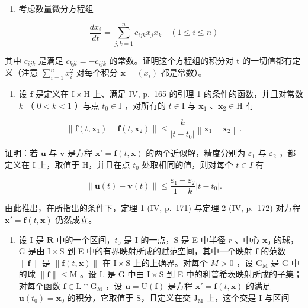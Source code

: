 \begin{enumerate}
\def\labelenumi{\arabic{enumi})}
\setcounter{enumi}{6}
\tightlist
\item
  考虑数量微分方程组
\end{enumerate}

\[
\frac {d x _ {i}}{d t} = \sum_ {j, k = 1} ^ {n} c _ {i j k} x _ {j} x _ {k} \quad (1 \leqslant i \leqslant n)
\]

其中 \(c_{ijk}\) 是满足 \(c_{kji} = -c_{ijk}\) 的常数。证明这个方程组的积分对 t 的一切值都有定义（注意 \(\sum_{i=1}^{n} x_{i}^{2}\) 对每个积分 \(\mathbf{x} = (x_{i})\) 都是常数）。

\begin{enumerate}
\def\labelenumi{\arabic{enumi})}
\setcounter{enumi}{7}
\tightlist
\item
  设 \(\mathbf{f}\) 是定义在 \(\mathrm{I} \times \mathrm{H}\) 上、满足 IV, p.~165 的引理 1 的条件的函数，并且对常数 \(k\) （ \(0 < k < 1\) ）与点 \(t_0 \in \mathrm{I}\) ，对所有的 \(t \in \mathrm{I}\) 与 \(\mathbf{x}_1\) 、\(\mathbf{x}_2 \in \mathrm{H}\) 有
\end{enumerate}

\[
\left\| \mathbf {f} (t, \mathbf {x} _ {1}) - \mathbf {f} (t, \mathbf {x} _ {2}) \right\| \leqslant \frac {k}{\left| t - t _ {0} \right|} \left\| \mathbf {x} _ {1} - \mathbf {x} _ {2} \right\|.
\]

证明：若 \(\mathbf{u}\) 与 \(\mathbf{v}\) 是方程 \(\mathbf{x}' = \mathbf{f}(t, \mathbf{x})\) 的两个近似解，精度分别为 \(\varepsilon_1\) 与 \(\varepsilon_2\) ，都定义在 I 上，取值于 H，并且在点 \(t_0\) 处取相同的值，则对每个 \(t \in I\) 有

\[
\left\| \mathbf {u} (t) - \mathbf {v} (t) \right\| \leqslant \frac {\varepsilon_ {1} - \varepsilon_ {2}}{1 - k} | t - t _ {0} |.
\]

由此推出，在所指出的条件下，定理 1 (IV, p.~171) 与定理 2 (IV, p.~172) 对方程 \(\mathbf{x}' = \mathbf{f}(t, \mathbf{x})\) 仍然成立。

\begin{enumerate}
\def\labelenumi{* \arabic{enumi})}
\setcounter{enumi}{8}
\tightlist
\item
  设 I 是 \(\mathbf{R}\) 中的一个区间，\(t_0\) 是 I 的一点，S 是 E 中半径 \(r\) 、中心 \(\mathbf{x}_0\) 的球，G 是由 \(\mathrm{I} \times \mathrm{S}\) 到 E 中的有界映射所成的赋范空间，其中一个映射 \(\mathbf{f}\) 的范数 \(\| \mathbf{f} \|\) 是 \(\| \mathbf{f}(t, \mathbf{x}) \|\) 在 \(\mathrm{I} \times \mathrm{S}\) 上的上确界。对每个 \(M > 0\) ，设 \(\mathrm{G}_{\mathrm{M}}\) 是 G 中的球 \(\| \mathbf{f} \| \leqslant \mathrm{M}\) 。设 L 是 G 中由 \(\mathrm{I} \times \mathrm{S}\) 到 E 中的利普希茨映射所成的子集；对每个函数 \(\mathbf{f} \in \mathrm{L} \cap \mathrm{G}_{\mathrm{M}}\) ，设 \(\mathbf{u} = \mathrm{U}(\mathbf{f})\) 是方程 \(\mathbf{x}' = \mathbf{f}(t, \mathbf{x})\) 的满足 \(\mathbf{u}(t_0) = \mathbf{x}_0\) 的积分，它取值于 S，且定义在交 \(\mathrm{J}_{\mathrm{M}}\) 上，这个交是 I 与区间
\end{enumerate}

